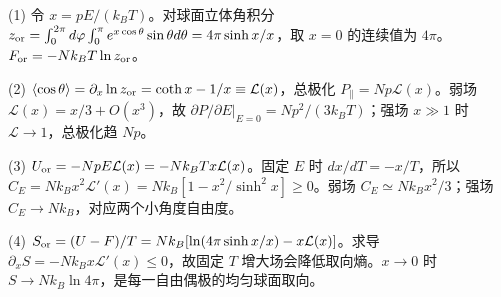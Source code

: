 (1) 令 \(x=pE/(k_BT)\)。对球面立体角积分 \(z_{\rm or}=\int_0^{2\pi}d\varphi\int_0^\pi e^{x\cos\theta}\sin\theta d\theta=4\pi\sinh x/x\)，取 \(x=0\) 的连续值为 \(4\pi\)。\(F_{\rm or}=-Nk_BT\ln z_{\rm or}\)。

(2) \(\langle\cos\theta\rangle=\partial_x\ln z_{\rm or}=\coth x-1/x\equiv\mathcal L(x)\)，总极化 \(P_{\parallel}=Np\mathcal L(x)\)。弱场 \(\mathcal L(x)=x/3+O(x^3)\)，故 \(\partial P/\partial E|_{E=0}=Np^2/(3k_BT)\)；强场 \(x\gg1\) 时 \(\mathcal L\to1\)，总极化趋 \(Np\)。

(3) \(U_{\rm or}=-NpE\mathcal L(x)=-Nk_BTx\mathcal L(x)\)。固定 \(E\) 时 \(dx/dT=-x/T\)，所以 \(C_{E}=Nk_Bx^2\mathcal L'(x)=Nk_B[1-x^2/\sinh^2x]\ge0\)。弱场 \(C_E\simeq Nk_Bx^2/3\)；强场 \(C_E\to Nk_B\)，对应两个小角度自由度。

(4) \(S_{\rm or}=(U-F)/T=Nk_B[\ln(4\pi\sinh x/x)-x\mathcal L(x)]\)。求导 \(\partial_xS=-Nk_Bx\mathcal L'(x)\le0\)，故固定 \(T\) 增大场会降低取向熵。\(x\to0\) 时 \(S\to Nk_B\ln4\pi\)，是每一自由偶极的均匀球面取向。
